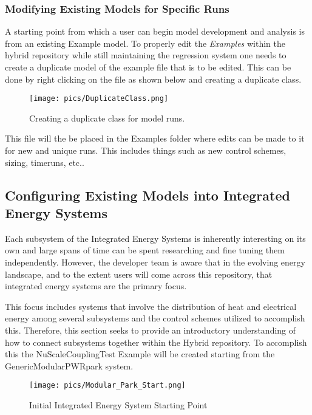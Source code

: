 \subsubsection{Modifying Existing Models for Specific Runs}
A starting point from which a user can begin model development and analysis is from an existing Example model. To properly edit the \textit{Examples} within the hybrid repository while still maintaining the regression system one needs to create a duplicate model of the example file that is to be edited. This can be done by right clicking on the file as shown below and creating a duplicate class.

\begin{figure}[hbtp]
\centering
\texttt{[image: pics/DuplicateClass.png]}
\caption{Creating a duplicate class for model runs.}
\label{Duplicate Class}
\end{figure}

This file will the be placed in the Examples folder where edits can be made to it for new and unique runs. This includes things such as new control schemes, sizing, timeruns, etc..

\subsection{Configuring Existing Models into Integrated Energy Systems}
Each subsystem of the Integrated Energy Systems is inherently interesting on its own and large spans of time can be spent researching and fine tuning them independently. However, the developer team is aware that in the evolving energy landscape, and to the extent users will come across this repository, that integrated energy systems are the primary focus.

This focus includes systems that involve the distribution of heat and electrical energy among several subsystems and the control schemes utilized to accomplish this. Therefore, this section seeks to provide an introductory understanding of how to connect subsystems together within the Hybrid repository. To accomplish this the NuScale\textunderscore Coupling\textunderscore Test Example will be created starting from the GenericModularPWR\textunderscore park system.

\begin{figure}[hbtp]
\centering
\texttt{[image: pics/Modular\_Park\_Start.png]}
\caption{Initial Integrated Energy System Starting Point}
\label{modular park}
\end{figure}

